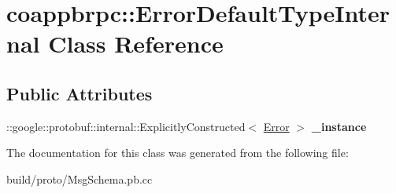 \hypertarget{classcoappbrpc_1_1ErrorDefaultTypeInternal}{}\section{coappbrpc\+:\+:Error\+Default\+Type\+Internal Class Reference}
\label{classcoappbrpc_1_1ErrorDefaultTypeInternal}
\subsection*{Public Attributes}
\begin{DoxyCompactItemize}
\item 
\mbox{\label{classcoappbrpc_1_1ErrorDefaultTypeInternal_ade1a1ad28e83164588942a5e28bf23c5}} 
\+::google\+::protobuf\+::internal\+::\+Explicitly\+Constructed$<$ \hyperlink{classcoappbrpc_1_1Error}{Error} $>$ {\bfseries \+\_\+instance}
\end{DoxyCompactItemize}


The documentation for this class was generated from the following file\+:\begin{DoxyCompactItemize}
\item 
build/proto/Msg\+Schema.\+pb.\+cc\end{DoxyCompactItemize}

